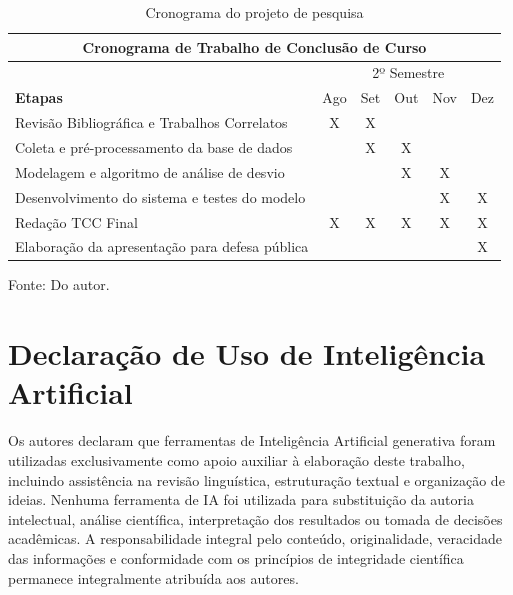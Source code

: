 \documentclass{UNESC}
\begin{document}
\begin{table}[H]
\centering
\caption{Cronograma do projeto de pesquisa}
\vspace{-0.2cm} 
\begin{tabular}{|p{8cm}|c|c|c|c|c|} \hline
\multicolumn{6}{|c|}{\textbf{Cronograma de Trabalho de Conclusão de Curso}}\\
\hline
& \multicolumn{5}{|c|}{2º Semestre}\\
\hline\hline
\textbf{Etapas} &Ago &Set &Out &Nov &Dez\\
\hline
Revisão Bibliográfica e Trabalhos Correlatos &X &X & & &\\
\hline
Coleta e pré-processamento da base de dados & &X &X & &\\
\hline
Modelagem e algoritmo de análise de desvio & & &X &X &\\
\hline
Desenvolvimento do sistema e testes do modelo & & & &X &X\\
\hline
Redação TCC Final &X &X &X &X &X\\
\hline
Elaboração da apresentação para defesa pública & & & & &X\\
\hline
\end{tabular}
\flushleft
\vspace{-0.1cm} 
\hspace{0cm}\footnotesize Fonte: Do autor.
\end{table}

\section*{Declaração de Uso de Inteligência Artificial}
Os autores declaram que ferramentas de Inteligência Artificial generativa foram utilizadas exclusivamente como apoio auxiliar à elaboração deste trabalho, incluindo assistência na revisão linguística, estruturação textual e organização de ideias. Nenhuma ferramenta de IA foi utilizada para substituição da autoria intelectual, análise científica, interpretação dos resultados ou tomada de decisões acadêmicas. A responsabilidade integral pelo conteúdo, originalidade, veracidade das informações e conformidade com os princípios de integridade científica permanece integralmente atribuída aos autores.






\renewcommand{\refname}{REFERÊNCIAS}

%
%
\end{document}
